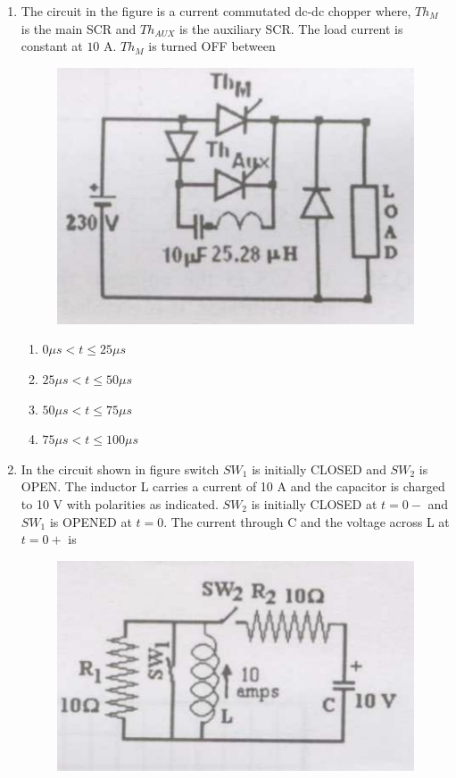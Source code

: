 \documentclass[journal,12pt,onecolumn]{IEEEtran}
\theoremstyle{remark}
\begin{document}
\begin{enumerate}
\item The circuit in the figure is a current commutated dc-dc chopper where, $Th_M$ is the main SCR and $Th_{AUX}$ is the auxiliary SCR. The load current is constant at $10$ A. $Th_M$ is turned OFF between
\begin{figure}[h]
	\centering
	\includegraphics[scale=0.5]{figs/fig 9.png}
	\label{Fig-7}
\end{figure}
\begin{enumerate}
\item $0 \mu s<t\leq 25 \mu s$
\item $25 \mu s<t\leq 50 \mu s$
\item $50 \mu s<t\leq 75 \mu s$
\item $75 \mu s<t\leq100\mu s$
\end{enumerate}
\item In the circuit shown in figure switch $SW_1$ is initially CLOSED and $SW_2$ is OPEN. The inductor L carries a current of 10 A and the capacitor is charged to 10 V with polarities as indicated. $SW_2$ is initially CLOSED at $t=0-$ and $SW_1$ is OPENED at $t=0$. The current through C and the voltage across L at $t=0+$ is
\begin{figure}[h]
	\centering
	\includegraphics[scale=0.5]{figs/fig 10.png}

\end{figure}
\end{enumerate}
\end{document}

